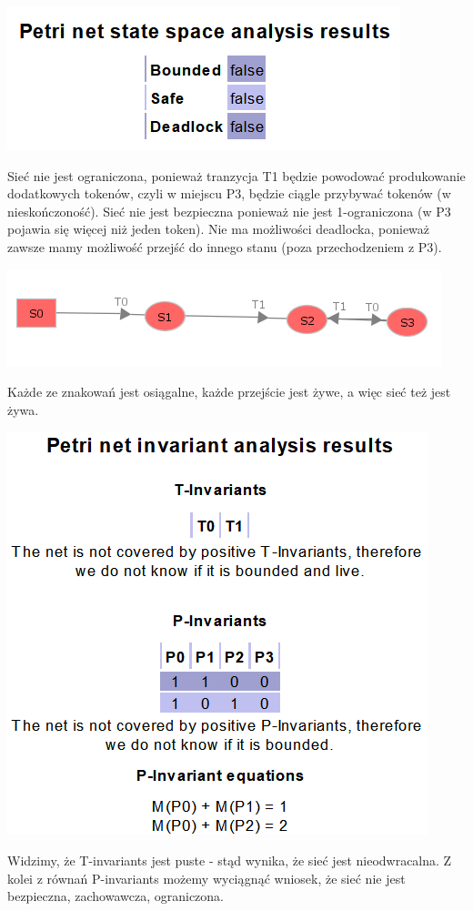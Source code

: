 \documentclass[12pt]{article}
\begin{document}
\begin{center}
\centering
    \includegraphics{zad1_state.png}
\end{center}
Sieć nie jest ograniczona, ponieważ tranzycja T1 będzie powodować produkowanie dodatkowych tokenów, czyli w miejscu P3, będzie ciągle przybywać tokenów (w nieskończoność). Sieć nie jest bezpieczna ponieważ nie jest 1-ograniczona (w P3 pojawia się więcej niż jeden token). Nie ma możliwości deadlocka, ponieważ zawsze mamy możliwość przejść do innego stanu (poza przechodzeniem z P3).

\begin{center}
\centering
    \includegraphics{zad1_reach.png}
\end{center}
Każde ze znakowań jest osiągalne, każde przejście jest żywe, a więc sieć też jest żywa. 


\begin{center}
\centering
    \includegraphics{zad1_invariant.png}
\end{center}
Widzimy, że T-invariants jest puste - stąd wynika, że sieć jest nieodwracalna. Z kolei z równań P-invariants możemy wyciągnąć wniosek, że sieć nie jest bezpieczna, zachowawcza, ograniczona.
\end{document}

